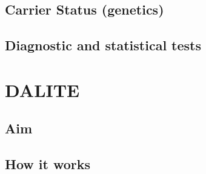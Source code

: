 \documentclass[]{book}
\begin{document}
\hypertarget{carrier-status-genetics}{%
\section{Carrier Status (genetics)}\label{carrier-status-genetics}}

\hypertarget{diagnostic-and-statistical-tests}{%
\section{Diagnostic and statistical tests}\label{diagnostic-and-statistical-tests}}

\hypertarget{dalite}{%
\chapter{DALITE}\label{dalite}}

\hypertarget{aim}{%
\section{Aim}\label{aim}}

\hypertarget{how-it-works}{%
\section{How it works}\label{how-it-works}}


\end{document}
